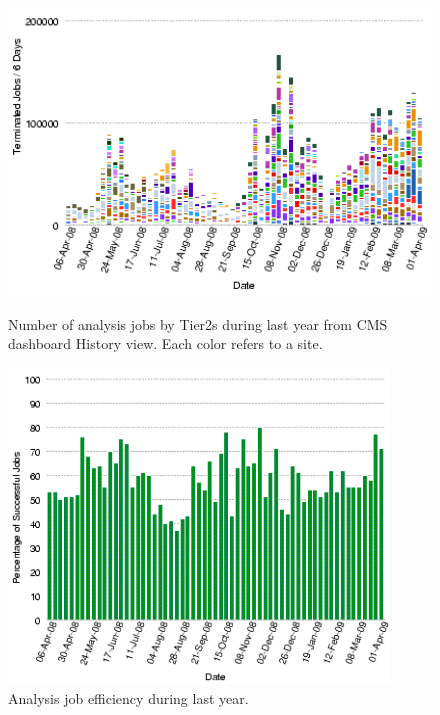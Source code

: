 \begin{figure}
\begin{minipage}{.55\textwidth}
\centering
\includegraphics[width=1.0\textwidth]{figures/AnalysisJobHistoryApril0809.png}
\caption{Number of analysis jobs by Tier2s during last year from CMS dashboard History view. Each color refers to a site. }
\label{fig:AnalysisJobHistoryApril0809}
\end{minipage}
\begin{minipage}{.45\textwidth}
\centering
\includegraphics[width=0.9\textwidth]{figures/T2EffApril0809.png}
\caption{Analysis job efficiency during last year. }
\label{fig:T2EffApril0809}
\end{minipage}
\end{figure}

